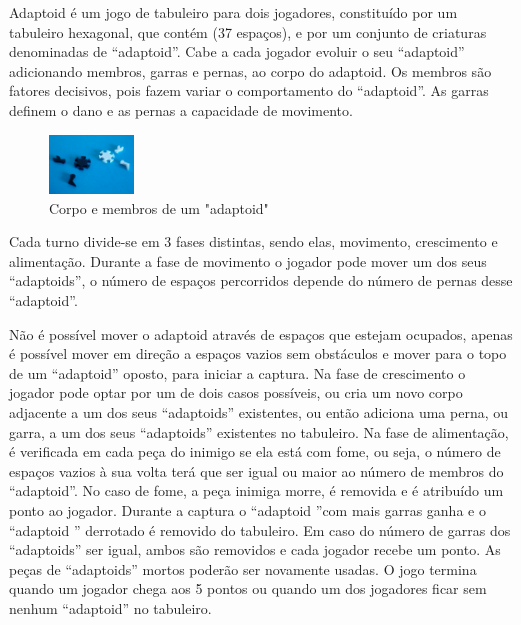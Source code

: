 \documentclass[a4paper]{article}
\begin{document}
Adaptoid é um jogo de tabuleiro para dois jogadores, constituído por um tabuleiro hexagonal, que contém (37 espaços), e por um conjunto de criaturas denominadas de “adaptoid”. Cabe a cada jogador evoluir o seu “adaptoid” adicionando membros, garras e pernas, ao corpo do adaptoid. Os membros são fatores decisivos, pois fazem variar o comportamento do “adaptoid”. As garras definem o dano e as pernas a capacidade de movimento.

\begin{figure}
    	\centering
	\vspace{-10pt}
   	\includegraphics[width=0.20\textwidth]{adaptoidsDissecados}
    	\caption{Corpo e membros de um "adaptoid"}
\end{figure}

Cada turno divide-se em 3 fases distintas, sendo elas, movimento, crescimento e alimentação. Durante a fase de movimento o jogador pode mover um dos seus “adaptoids”, o número de espaços percorridos depende do número de pernas desse “adaptoid”.

Não é possível mover o adaptoid através de espaços que estejam ocupados, apenas é possível mover em direção a espaços vazios sem obstáculos e mover para o topo de um “adaptoid” oposto, para iniciar a captura. Na fase de crescimento o jogador pode optar por um de dois casos possíveis, ou cria um novo corpo adjacente a um dos seus “adaptoids” existentes, ou então adiciona uma perna, ou garra, a um dos seus “adaptoids” existentes no tabuleiro. Na fase de alimentação, é verificada em cada peça do inimigo se ela está com fome, ou seja, o número  de espaços vazios à sua volta terá que ser igual ou maior ao número de membros do “adaptoid”. No caso de fome, a peça inimiga morre, é removida e é atribuído um ponto ao jogador. Durante a captura o “adaptoid ”com mais garras ganha e o “adaptoid ” derrotado é removido do tabuleiro. Em caso do número de garras dos “adaptoids” ser igual, ambos são removidos e cada jogador recebe um ponto. As peças de “adaptoids” mortos poderão ser novamente usadas. O jogo termina quando um jogador chega aos 5 pontos ou quando um dos jogadores ficar sem nenhum “adaptoid” no tabuleiro.
\end{document}

